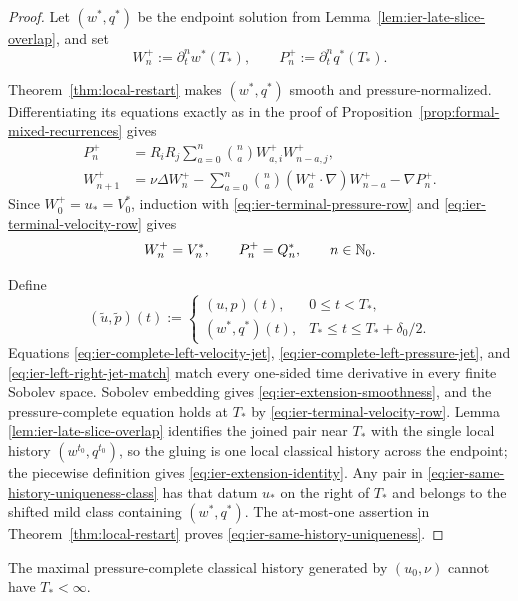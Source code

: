 \begin{proof}
Let \((w^*,q^*)\) be the endpoint solution from
Lemma~\ref{lem:ier-late-slice-overlap}, and set
\[
 W_n^+:=\partial_t^nw^*(T_*),
 \qquad
 P_n^+:=\partial_t^nq^*(T_*).
\]
\begin{samepage}
Theorem~\ref{thm:local-restart} makes \((w^*,q^*)\) smooth and
pressure-normalized.  Differentiating its equations exactly as in the proof of
Proposition~\ref{prop:formal-mixed-recurrences} gives
\begin{align*}
 P_n^+&=R_iR_j\sum_{a=0}^{n}\binom naW_{a,i}^+W_{n-a,j}^+,\\
 W_{n+1}^+&=\nu\Delta W_n^+
 -\sum_{a=0}^{n}\binom na(W_a^+\cdot\nabla)W_{n-a}^+
 -\nabla P_n^+.
\end{align*}
Since \(W_0^+=u_*=V_0^*\), induction with
\eqref{eq:ier-terminal-pressure-row} and
\eqref{eq:ier-terminal-velocity-row} gives
\begin{equation}
 W_n^+=V_n^*,
 \qquad P_n^+=Q_n^*,
 \qquad n\in\mathbb N_0.
 \label{eq:ier-left-right-jet-match}
\end{equation}
\par
\end{samepage}

Define
\[
 (\widetilde u,\widetilde p)(t)
 :=\begin{cases}
 (u,p)(t),&0\le t<T_*,\\
 (w^*,q^*)(t),&T_*\le t\le T_*+\delta_0/2.
 \end{cases}
\]
Equations \eqref{eq:ier-complete-left-velocity-jet},
\eqref{eq:ier-complete-left-pressure-jet}, and
\eqref{eq:ier-left-right-jet-match} match every one-sided time derivative in
every finite Sobolev space.  Sobolev embedding gives
\eqref{eq:ier-extension-smoothness}, and the pressure-complete equation holds
at \(T_*\) by \eqref{eq:ier-terminal-velocity-row}.  Lemma
\ref{lem:ier-late-slice-overlap} identifies the joined pair near \(T_*\) with
the single local history \((w^{t_0},q^{t_0})\), so the gluing is one local
classical history across the endpoint; the piecewise definition gives
\eqref{eq:ier-extension-identity}.  Any pair in
\eqref{eq:ier-same-history-uniqueness-class} has that datum \(u_*\) on
the right of \(T_*\) and belongs to the shifted mild class containing
\((w^*,q^*)\).  The at-most-one assertion in
Theorem~\ref{thm:local-restart} proves
\eqref{eq:ier-same-history-uniqueness}.
\end{proof}

\begin{corollary}
\label{cor:ier-maximal-time-contradiction}
The maximal pressure-complete classical history generated by
\((u_0,\nu)\) cannot have \(T_*<\infty\).
\end{corollary}


